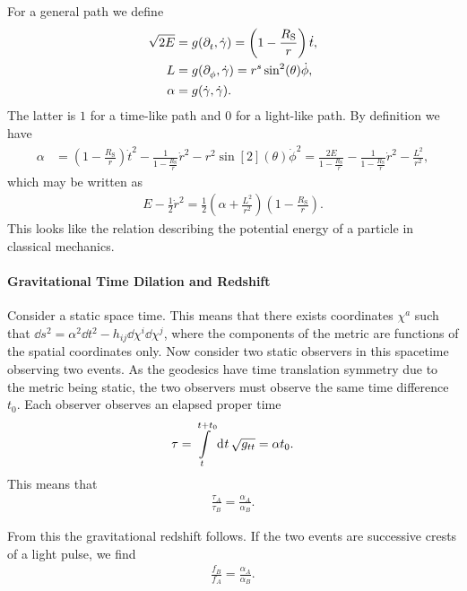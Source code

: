 For a general path we define
\begin{align*}
	\sqrt{2E} &= g(\partial^{}_{t}, \dot{\gamma}) = \left(1 - \frac{R_{\text{S}}}{r}\right)\dot{t}, \\
	L         &= g(\partial^{}_{\phi}, \dot{\gamma}) = r^{s}\sin[2](\theta)\dot{\phi}, \\
	\alpha    &= g(\dot{\gamma}, \dot{\gamma}).
\end{align*}
The latter is $1$ for a time-like path and $0$ for a light-like path. By definition we have
\begin{align*}
	\alpha &= \left(1 - \frac{R_{\text{S}}}{r}\right)\dot{t}^{2} - \frac{1}{1 - \frac{R_{\text{S}}}{r}}\dot{r}^{2} - r^{2}\sin[2](\theta)\dot{\phi}^{2} = \frac{2E}{1 - \frac{R_{\text{S}}}{r}} - \frac{1}{1 - \frac{R_{\text{S}}}{r}}\dot{r}^{2} - \frac{L^{2}}{r^{2}},
\end{align*}
which may be written as
\begin{align*}
	E - \frac{1}{2}\dot{r}^{2} = \frac{1}{2}\left(\alpha + \frac{L^{2}}{r^{2}}\right)\left(1 - \frac{R_{\text{S}}}{r}\right).
\end{align*}
This looks like the relation describing the potential energy of a particle in classical mechanics.

\paragraph{Gravitational Time Dilation and Redshift}
Consider a static space time. This means that there exists coordinates $\chi^{a}$ such that $\dd{s}^{2} = \alpha^{2}\dd{t}^{2} - h_{ij}\dd{\chi}^{i}\dd{\chi}^{j}$, where the components of the metric are functions of the spatial coordinates only. Now consider two static observers in this spacetime observing two events. As the geodesics have time translation symmetry due to the metric being static, the two observers must observe the same time difference $t_{0}$. Each observer observes an elapsed proper time
\begin{align*}
	\tau = \int\limits_{t}^{t + t_{0}}\dd[]{t}\sqrt{g_{tt}} = \alpha t_{0}.
\end{align*}
This means that
\begin{align*}
	\frac{\tau_{A}}{\tau_{B}} = \frac{\alpha_{A}}{\alpha_{B}}.
\end{align*}

From this the gravitational redshift follows. If the two events are successive crests of a light pulse, we find
\begin{align*}
	\frac{f_{B}}{f_{A}} = \frac{\alpha_{A}}{\alpha_{B}}.
\end{align*}

